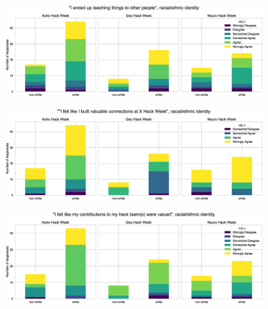 \documentclass{aastex62}
\begin{document}
\begin{figure}[h!]
\centering
\includegraphics[width=\textwidth]{Q23_2_Q30_stackedbars.eps}
\caption{}
\label{fig:survey}
\end{figure}

\begin{figure}[h!]
\centering
\includegraphics[width=\textwidth]{Q24_5_Q30_stackedbars.eps}
\caption{}
\label{fig:survey}
\end{figure}

\begin{figure}[h!]
\centering
\includegraphics[width=\textwidth]{Q19_5_Q30_stackedbars.eps}
\caption{}
\label{fig:survey}
\end{figure}

\newpage


\end{document}
